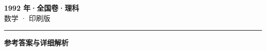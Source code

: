 \documentclass[zihao=5, a4paper]{ctexart}
\begin{document}
\begin{center}
  {\Large\bfseries 1992 年·全国卷·理科}\\[4pt]
  {\large 数学 · 印刷版}
\end{center}
\medskip
{}

\par\bigskip\hrule\bigskip
{}
\begin{center}{\large\bfseries 参考答案与详细解析}\end{center}
\smallskip

\end{document}
